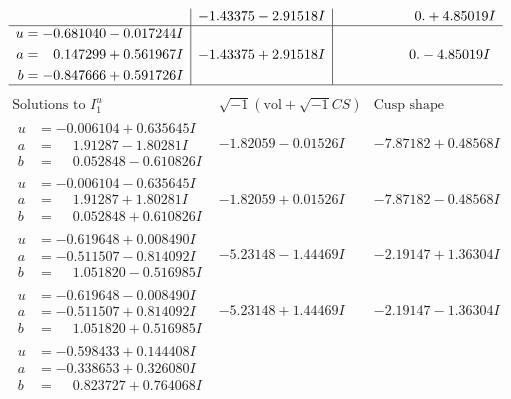 \documentclass[1p]{elsarticle_modified}
\theoremstyle{definition}
\newcommand{\I}{\sqrt{-1}}
\begin{document}
$$\begin{array}{c|c|c}
 & -1.43375 - 2.91518 I & \phantom{-0.000000 -}0. + 4.85019 I \\ \hline\begin{aligned}
u &= -0.681040 - 0.017244 I \\
a &= \phantom{-}0.147299 + 0.561967 I \\
b &= -0.847666 + 0.591726 I\end{aligned}
 & -1.43375 + 2.91518 I & \phantom{-0.000000 } 0. - 4.85019 I\\
 \hline 
 \end{array}$$\newpage$$\begin{array}{c|c|c}  
\text{Solutions to }I^u_{1}& \I (\text{vol} + \sqrt{-1}CS) & \text{Cusp shape}\\
 \hline 
\begin{aligned}
u &= -0.006104 + 0.635645 I \\
a &= \phantom{-}1.91287 - 1.80281 I \\
b &= \phantom{-}0.052848 - 0.610826 I\end{aligned}
 & -1.82059 - 0.01526 I & -7.87182 + 0.48568 I \\ \hline\begin{aligned}
u &= -0.006104 - 0.635645 I \\
a &= \phantom{-}1.91287 + 1.80281 I \\
b &= \phantom{-}0.052848 + 0.610826 I\end{aligned}
 & -1.82059 + 0.01526 I & -7.87182 - 0.48568 I \\ \hline\begin{aligned}
u &= -0.619648 + 0.008490 I \\
a &= -0.511507 - 0.814092 I \\
b &= \phantom{-}1.051820 - 0.516985 I\end{aligned}
 & -5.23148 - 1.44469 I & -2.19147 + 1.36304 I \\ \hline\begin{aligned}
u &= -0.619648 - 0.008490 I \\
a &= -0.511507 + 0.814092 I \\
b &= \phantom{-}1.051820 + 0.516985 I\end{aligned}
 & -5.23148 + 1.44469 I & -2.19147 - 1.36304 I \\ \hline\begin{aligned}
u &= -0.598433 + 0.144408 I \\
a &= -0.338653 + 0.326080 I \\
b &= \phantom{-}0.823727 + 0.764068 I\end{aligned}

\end{array}$$
\end{document}
